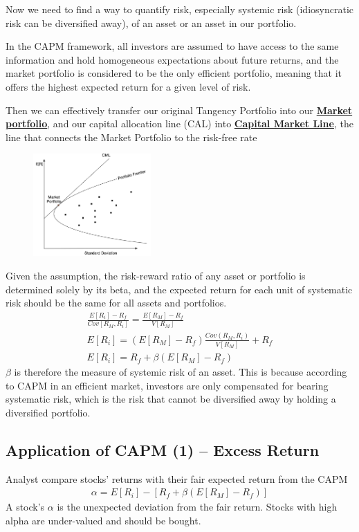 Now we need to find a way to quantify risk, especially systemic risk (idiosyncratic risk can be diversified away), of an asset or an asset in our portfolio. 

\begin{multicols}{2}
    
In the CAPM framework, all investors are assumed to have access to the same information and hold homogeneous expectations about future returns, and the market portfolio is considered to be the only efficient portfolio, meaning that it offers the highest expected return for a given level of risk.\par 

Then we can effectively transfer our original Tangency Portfolio into our \underline{\textbf{Market portfolio}}, and our capital allocation line (CAL) into \underline{\textbf{Capital Market Line}}, the line that connects the Market Portfolio to the risk-free rate
\begin{figure}[H]
    \centering 
    \includegraphics[width =0.4\textwidth]{Figure/cml.png}
\end{figure}
Given the assumption, the risk-reward ratio of any asset or portfolio is determined solely by its beta, and the expected return for each unit of systematic risk should be the same for all assets and portfolios. 
\begin{gather*}
    \frac{E[R_i]-R_f}{Cov[R_M, R_i]} = \frac{E[R_M]-R_f}{V[R_M]}\\[0.1cm]
    E[R_i] = (E[R_M]-R_f)\frac{Cov(R_M,R_i)}{V[R_M]}+R_f\\
    \boxed{E[R_i] =  R_f + \beta(E[R_M]-R_f)}
\end{gather*}
$\beta$ is therefore the measure of systemic risk of an asset. This is because according to CAPM in an efficient market, investors are only compensated for bearing systematic risk, which is the risk that cannot be diversified away by holding a diversified portfolio.

\subsection{Application of CAPM (1) -- Excess Return}
Analyst compare stocks' returns with their fair expected return from the CAPM
\begin{gather*}
    \alpha = E[R_i]-[R_f+\beta(E[R_M]-R_f)]
\end{gather*}
A stock's $\alpha$ is the unexpected deviation from the fair return. Stocks with high alpha are under-valued and should be bought.


\end{multicols}
